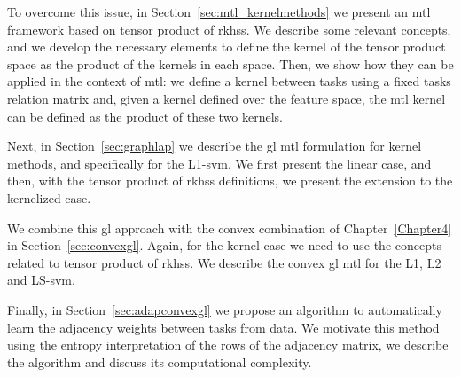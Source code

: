 To overcome this issue, in Section~\ref{sec:mtl_kernelmethods} we present an \acrshort{mtl} framework based on tensor product of \acrshort{rkhss}. We describe some relevant concepts, and we develop the necessary elements to define the kernel of the tensor product space as the product of the kernels in each space. Then, we show how they can be applied in the context of \acrshort{mtl}: we define a kernel between tasks using a fixed tasks relation matrix and, given a kernel defined over the feature space, the \acrshort{mtl} kernel can be defined as the product of these two kernels.

Next, in Section~\ref{sec:graphlap} we describe the \acrshort{gl} \acrshort{mtl} formulation for kernel methods, and specifically for the L1-\acrshort{svm}. We first present the linear case, and then, with the tensor product of \acrshort{rkhss} definitions, we present the extension to the kernelized case.

We combine this \acrshort{gl} approach with the convex combination of Chapter~\ref{Chapter4} in Section~\ref{sec:convexgl}. Again, for the kernel case we need to use the concepts related to tensor product of \acrshort{rkhss}. We describe the convex \acrshort{gl} \acrshort{mtl} for the L1, L2 and LS-\acrshort{svm}.

Finally, in Section~\ref{sec:adapconvexgl} we propose an algorithm to automatically learn the adjacency weights between tasks from data. We motivate this method using the entropy interpretation of the rows of the adjacency matrix, we describe the algorithm and discuss its computational complexity.




